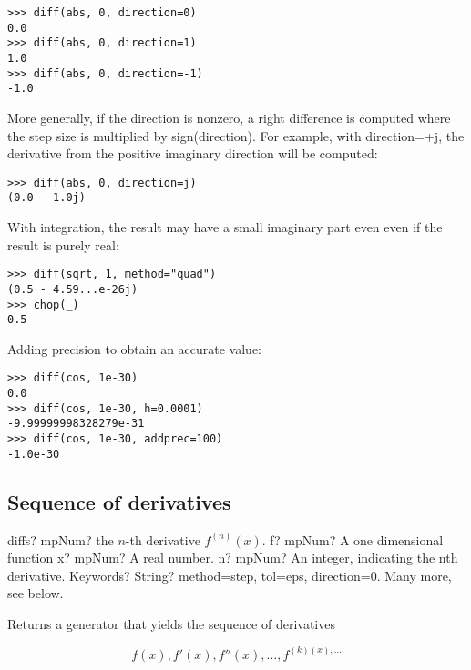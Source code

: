 \begin{lstlisting}
>>> diff(abs, 0, direction=0)
0.0
>>> diff(abs, 0, direction=1)
1.0
>>> diff(abs, 0, direction=-1)
-1.0
\end{lstlisting}

More generally, if the direction is nonzero, a right difference is computed where the step size is multiplied by sign(direction). For example, with direction=+j, the derivative from the positive imaginary direction will be computed:

\begin{lstlisting}
>>> diff(abs, 0, direction=j)
(0.0 - 1.0j)
\end{lstlisting}

With integration, the result may have a small imaginary part even even if the result is purely real:

\begin{lstlisting}
>>> diff(sqrt, 1, method="quad")
(0.5 - 4.59...e-26j)
>>> chop(_)
0.5
\end{lstlisting}

Adding precision to obtain an accurate value:

\begin{lstlisting}
>>> diff(cos, 1e-30)
0.0
>>> diff(cos, 1e-30, h=0.0001)
-9.99999998328279e-31
>>> diff(cos, 1e-30, addprec=100)
-1.0e-30
\end{lstlisting}



\subsection{Sequence of derivatives}

\begin{mpFunctionsExtract}
	\mpFunctionFour
	{diffs? mpNum? the $n$-th derivative $f^{(n)}(x)$.}
	{f? mpNum? A one dimensional function}
	{x? mpNum? A real number.}
	{n? mpNum? An integer, indicating the nth derivative.}		
	{Keywords? String? method=step, tol=eps, direction=0. Many more, see below.}	
\end{mpFunctionsExtract}

\vpara
Returns a generator that yields the sequence of derivatives

\begin{equation}
f(x),f'(x),f''(x),\ldots,f^{(k)(x),\ldots}
\end{equation}

